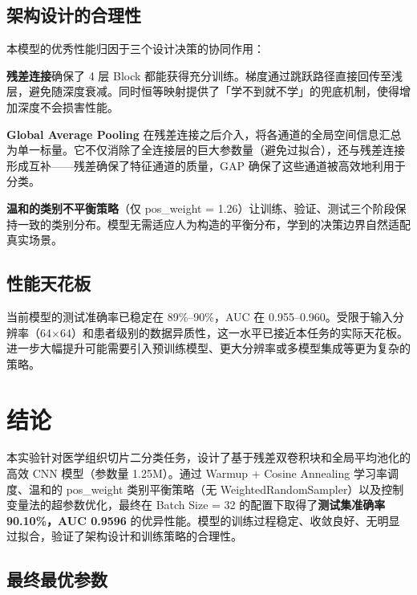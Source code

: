 \documentclass[12pt,a4paper]{ctexart}
\begin{document}
\subsection{架构设计的合理性}

本模型的优秀性能归因于三个设计决策的协同作用：

\textbf{残差连接}确保了 4 层 Block 都能获得充分训练。梯度通过跳跃路径直接回传至浅层，避免随深度衰减。同时恒等映射提供了「学不到就不学」的兜底机制，使得增加深度不会损害性能。

\textbf{Global Average Pooling} 在残差连接之后介入，将各通道的全局空间信息汇总为单一标量。它不仅消除了全连接层的巨大参数量（避免过拟合），还与残差连接形成互补——残差确保了特征通道的质量，GAP 确保了这些通道被高效地利用于分类。

\textbf{温和的类别不平衡策略}（仅 pos\_weight = 1.26）让训练、验证、测试三个阶段保持一致的类别分布。模型无需适应人为构造的平衡分布，学到的决策边界自然适配真实场景。

\subsection{性能天花板}

当前模型的测试准确率已稳定在 89\%--90\%，AUC 在 0.955--0.960。受限于输入分辨率（64$\times$64）和患者级别的数据异质性，这一水平已接近本任务的实际天花板。进一步大幅提升可能需要引入预训练模型、更大分辨率或多模型集成等更为复杂的策略。

\section{结论}

本实验针对医学组织切片二分类任务，设计了基于残差双卷积块和全局平均池化的高效 CNN 模型（参数量 1.25M）。通过 Warmup + Cosine Annealing 学习率调度、温和的 pos\_weight 类别平衡策略（无 WeightedRandomSampler）以及控制变量法的超参数优化，最终在 Batch Size = 32 的配置下取得了\textbf{测试集准确率 90.10\%，AUC 0.9596} 的优异性能。模型的训练过程稳定、收敛良好、无明显过拟合，验证了架构设计和训练策略的合理性。

\subsection*{最终最优参数}
\end{document}
